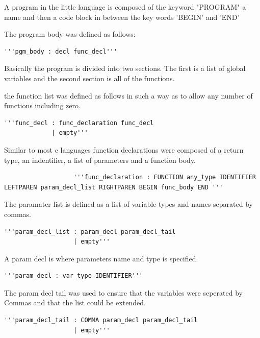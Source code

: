 \documentclass[12pt]{article}
\begin{document}
           A program in the little language is composed of the keyword "PROGRAM" a name and then a code block in between the key words 'BEGIN' and 'END'
           
           The program body was defined as follows:
           \begin{verbatim}
'''pgm_body : decl func_decl'''
           \end{verbatim}
           
           Basically the program is divided into two sections.  The first is a list of global variables and the second section is all of the functions.
           
           the function list was defined as follows in such a way as to allow any number of functions including zero.
           
           \begin{verbatim}
'''func_decl : func_declaration func_decl
             | empty'''
            \end{verbatim}
            
            Similar to most c languages function declarations were composed of a return type, an indentifier, a list of parameters and a function body.
            
            \begin{verbatim}
                   '''func_declaration : FUNCTION any_type IDENTIFIER LEFTPAREN param_decl_list RIGHTPAREN BEGIN func_body END '''
           \end{verbatim}
           
           The paramater list is defined as a list of variable types and names separated by commas.
           
            \begin{verbatim}
'''param_decl_list : param_decl param_decl_tail
                   | empty'''
           \end{verbatim}
           
            A param decl is where parameters name and type is specified.
            
            \begin{verbatim}
'''param_decl : var_type IDENTIFIER'''
           \end{verbatim}
                        
           The param decl tail was used to ensure that the variables were seperated by Commas and that the list could be extended.
           
           \begin{verbatim}
'''param_decl_tail : COMMA param_decl param_decl_tail
                   | empty'''
           \end{verbatim}
           
\end{document}

